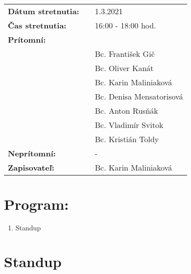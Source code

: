 \documentclass{article}
\begin{document}
    

    \begin{table}[h]
        \begin{tabular}{lllll}
            \multicolumn{3}{l}{\textbf{Dátum stretnutia:}} & & 1.3.2021 \\
            \multicolumn{3}{l}{\textbf{Čas stretnutia:}} & & 16:00 - 18:00 hod. \\
            \multicolumn{3}{l}{\textbf{Prítomní:}} \\
            & & & & Bc. František Gič  \\
            & & & & Bc. Oliver Kanát \\
            & & & & Bc. Karin Maliniaková \\
            & & & & Bc. Denisa Mensatorisová \\
            & & & & Bc. Anton Rusňák \\
            & & & & Bc. Vladimír Svitok \\
            & & & & Bc. Kristián Toldy \\
            \multicolumn{3}{l}{\textbf{Neprítomní:}} & & -\\
            \multicolumn{3}{l}{\textbf{Zapisovateľ:}} & & Bc. Karin Maliniaková \\
        \end{tabular}
        \label{tab:grades}
    \end{table}

    \section*{Program:}

    \begin{enumerate}
        \item Standup
    \end{enumerate}

    \section*{Standup}
\end{document}

